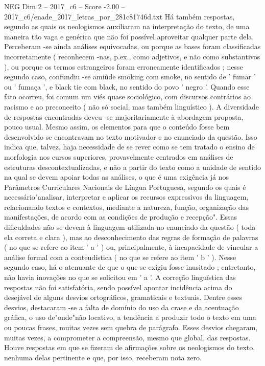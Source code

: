 \begin{textsample}{NEG Dim 2 – 2017\_c6 – Score -2.00 – 2017\_c6/enade\_2017\_letras\_por\_281c81746d.txt}
Há também respostas, segundo as quais os neologismos auxiliaram na interpretação do texto, de uma maneira tão vaga e genérica que não foi possível aproveitar qualquer parte dela.
Perceberam -se ainda análises equivocadas, ou porque as bases foram classificadas incorretamente ( reconhecem -nas, p.ex., como adjetivos, e não como substantivos ), ou porque os termos estrangeiros foram erroneamente identificados ; nesse segundo caso, confundiu -se amiúde smoking com smoke, no sentido de ' fumar ' ou ' fumaça ', e black tie com black, no sentido do povo ' negro '.
Quando esse fato ocorreu, foi comum um viés quase sociológico, com discursos contrários ao racismo e ao preconceito ( não só social, mas também linguístico ).
A diversidade de respostas encontradas deveu -se majoritariamente à abordagem proposta, pouco usual.
Mesmo assim, os elementos para que o conteúdo fosse bem desenvolvido se encontravam no texto motivador e no enunciado da questão.
Isso indica que, talvez, haja necessidade de se rever como se tem tratado o ensino de morfologia nos cursos superiores, provavelmente centrados em análises de estruturas descontextualizadas, e não a partir do texto como a unidade de sentido na qual se devem apoiar todas as análises, o que é uma exigência já nos Parâmetros Curriculares Nacionais de Língua Portuguesa, segundo os quais é necessário"analisar, interpretar e aplicar os recursos expressivos da linguagem, relacionando textos e contextos, mediante a natureza, função, organização das manifestações, de acordo com as condições de produção e recepção".
Essas dificuldades não se devem à linguagem utilizada no enunciado da questão ( toda ela correta e clara ), mas ao desconhecimento das regras de formação de palavras ( no que se refere ao item ' a ' ) ou, principalmente, à incapacidade de vincular a análise formal com a conteudística ( no que se refere ao item ' b ' ).
Nesse segundo caso, há o atenuante de que o que se exigiu fosse inusitado ; entretanto, não havia inovações no que se solicitou em ' a '.
A correção linguística das respostas não foi satisfatória, sendo possível apontar incidência acima do desejável de alguns desvios ortográficos, gramaticais e textuais.
Dentre esses desvios, destacaram -se a falta de domínio do uso da crase e da acentuação gráfica, o uso de"onde"não locativo, a tendência a produzir todo o texto em uma ou poucas frases, muitas vezes sem quebra de parágrafo.
Esses desvios chegaram, muitas vezes, a comprometer a compreensão, mesmo que global, das respostas.
Houve respostas em que se fizeram de afirmações sobre os neologismos do texto, nenhuma delas pertinente e que, por isso, receberam nota zero.

\end{textsample}
